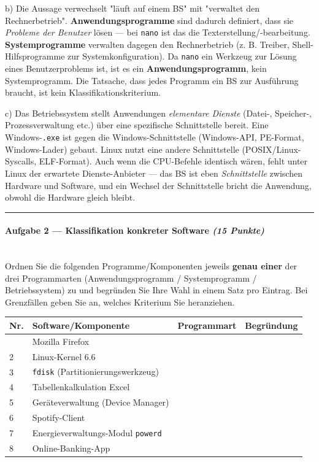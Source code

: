 \documentclass[11pt, a4paper]{article}
\begin{document}
b) Die Aussage verwechselt "läuft auf einem BS" mit "verwaltet den Rechnerbetrieb". \textbf{Anwendungsprogramme} sind dadurch definiert, dass sie \textit{Probleme der Benutzer} lösen — bei \texttt{nano} ist das die Texterstellung/-bearbeitung. \textbf{Systemprogramme} verwalten dagegen den Rechnerbetrieb (z. B. Treiber, Shell-Hilfsprogramme zur Systemkonfiguration). Da \texttt{nano} ein Werkzeug zur Lösung eines Benutzerproblems ist, ist es ein \textbf{Anwendungsprogramm}, kein Systemprogramm. Die Tatsache, dass jedes Programm ein BS zur Ausführung braucht, ist kein Klassifikationskriterium.


c) Das Betriebssystem stellt Anwendungen \textit{elementare Dienste} (Datei-, Speicher-, Prozessverwaltung etc.) über eine spezifische Schnittstelle bereit. Eine Windows-\texttt{.exe} ist gegen die Windows-Schnittstelle (Windows-API, PE-Format, Windows-Lader) gebaut. Linux nutzt eine andere Schnittstelle (POSIX/Linux-Syscalls, ELF-Format). Auch wenn die CPU-Befehle identisch wären, fehlt unter Linux der erwartete Dienste-Anbieter — das BS ist eben \textit{Schnittstelle} zwischen Hardware und Software, und ein Wechsel der Schnittstelle bricht die Anwendung, obwohl die Hardware gleich bleibt.



\noindent\textcolor{rulegray}{\rule{\linewidth}{0.4pt}}


\paragraph{Aufgabe 2 — Klassifikation konkreter Software \textit{(15 Punkte)}}\mbox{}\\[2pt]

Ordnen Sie die folgenden Programme/Komponenten jeweils \textbf{genau einer} der drei Programmarten (Anwendungsprogramm / Systemprogramm / Betriebssystem) zu und begründen Sie Ihre Wahl in einem Satz pro Eintrag. Bei Grenzfällen geben Sie an, welches Kriterium Sie heranziehen.



{\small
\begin{tabularx}{\linewidth}{XXXX}
\hline
\rowcolor{tableheadbg}
{\color{white}\textbf{Nr.}} & {\color{white}\textbf{Software/Komponente}} & {\color{white}\textbf{Programmart}} & {\color{white}\textbf{Begründung}} \\[2pt]
\hline
\endhead
\hline
\endfoot
1 & Mozilla Firefox &  &  \\
2 & Linux-Kernel 6.6 &  &  \\
3 & \texttt{fdisk} (Partitionierungswerkzeug) &  &  \\
4 & Tabellenkalkulation Excel &  &  \\
5 & Geräteverwaltung (Device Manager) &  &  \\
6 & Spotify-Client &  &  \\
7 & Energieverwaltungs-Modul \texttt{powerd} &  &  \\
8 & Online-Banking-App &  &  \\
\end{tabularx}
}
\end{document}
